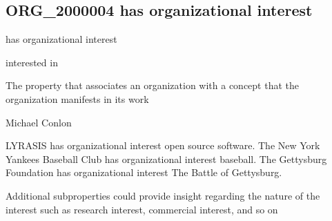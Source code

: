 \documentclass[letterpaper,10pt,english]{sphinxmanual}
\begin{document}
\subsection{ORG\_2000004 \sphinxhyphen{} has organizational interest}
\label{\detokenize{doc-ORG_2000004:org-2000004-has-organizational-interest}}\label{\detokenize{doc-ORG_2000004:index-0}}\label{\detokenize{doc-ORG_2000004::doc}}
\begin{sphinxShadowBox}

\sphinxAtStartPar
has organizational interest
\end{sphinxShadowBox}

\begin{sphinxShadowBox}

\sphinxAtStartPar
interested in
\end{sphinxShadowBox}

\begin{sphinxShadowBox}

\sphinxAtStartPar
The property that associates an organization with a concept that the organization manifests in its work
\end{sphinxShadowBox}

\begin{sphinxShadowBox}

\sphinxAtStartPar
Michael Conlon 
\end{sphinxShadowBox}

\begin{sphinxShadowBox}

\sphinxAtStartPar
LYRASIS has organizational interest open source software.  The New York Yankees Baseball Club has organizational interest baseball.  The Gettysburg Foundation has organizational interest The Battle of Gettysburg.
\end{sphinxShadowBox}

\begin{sphinxShadowBox}

\sphinxAtStartPar
Additional subproperties could provide insight regarding the nature of the interest such as research interest, commercial interest, and so on
\end{sphinxShadowBox}

\begin{sphinxShadowBox}

\sphinxAtStartPar
{}
\end{sphinxShadowBox}
\end{document}

